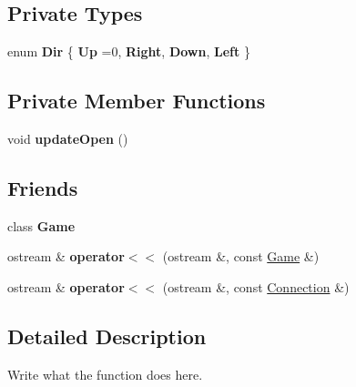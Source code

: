 \subsection*{Private Types}
\begin{DoxyCompactItemize}
\item 
\hypertarget{structNode_a2d9bbf468b6e46a184fd9deec2ffb82a}{enum {\bfseries Dir} \{ {\bfseries Up} =0, 
{\bfseries Right}, 
{\bfseries Down}, 
{\bfseries Left}
 \}}\label{structNode_a2d9bbf468b6e46a184fd9deec2ffb82a}

\end{DoxyCompactItemize}
\subsection*{Private Member Functions}
\begin{DoxyCompactItemize}
\item 
\hypertarget{structNode_aca11179560b61f0d118c6d86865d20cc}{void {\bfseries update\+Open} ()}\label{structNode_aca11179560b61f0d118c6d86865d20cc}

\end{DoxyCompactItemize}
\subsection*{Friends}
\begin{DoxyCompactItemize}
\item 
\hypertarget{structNode_aa2fab026580d6f14280c2ffb8063a314}{class {\bfseries Game}}\label{structNode_aa2fab026580d6f14280c2ffb8063a314}

\item 
\hypertarget{structNode_a7bb9176e07b6f6c73c930dba6400265f}{ostream \& {\bfseries operator$<$$<$} (ostream \&, const \hyperlink{classGame}{Game} \&)}\label{structNode_a7bb9176e07b6f6c73c930dba6400265f}

\item 
\hypertarget{structNode_a43649da031123d524f6605d2b0b4ebc8}{ostream \& {\bfseries operator$<$$<$} (ostream \&, const \hyperlink{structConnection}{Connection} \&)}\label{structNode_a43649da031123d524f6605d2b0b4ebc8}

\end{DoxyCompactItemize}


\subsection{Detailed Description}
Write what the function does here. 

